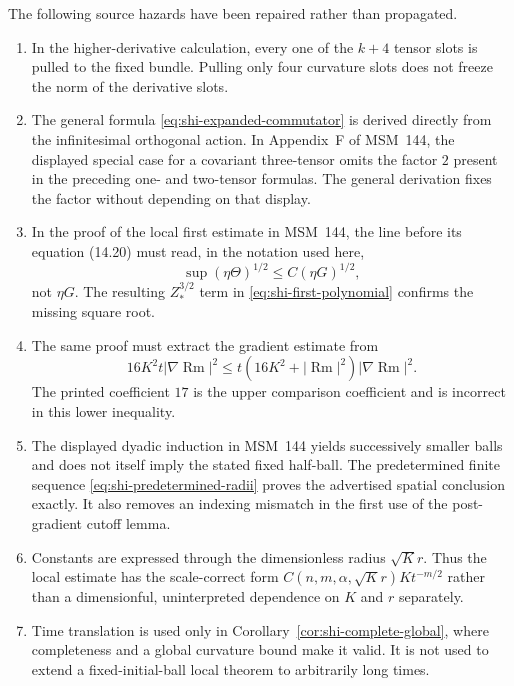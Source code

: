 \documentclass[10pt]{coll-l}
\theoremstyle{definition}
\theoremstyle{remark}
\numberwithin{section}{chapter}
\numberwithin{equation}{chapter}
\newcommand{\Rm}{\operatorname{Rm}}
\begin{document}
The following source hazards have been repaired rather than propagated.
\begin{enumerate}
\item In the higher-derivative calculation, every one of the $k+4$ tensor
      slots is pulled to the fixed bundle.  Pulling only four curvature slots
      does not freeze the norm of the derivative slots.

\item The general formula \eqref{eq:shi-expanded-commutator} is derived
      directly from the infinitesimal orthogonal action.  In Appendix~F of
      MSM~144, the displayed special case for a covariant three-tensor omits
      the factor $2$ present in the preceding one- and two-tensor formulas.
      The general derivation fixes the factor without depending on that
      display.

\item In the proof of the local first estimate in MSM~144, the line before
      its equation (14.20) must read, in the notation used here,
      \[
          \sup(\eta\Theta)^{1/2}\leq C(\eta G)^{1/2},
      \]
      not $\eta G$.  The resulting $Z_*^{3/2}$ term in
      \eqref{eq:shi-first-polynomial} confirms the missing square root.

\item The same proof must extract the gradient estimate from
      \[
        16K^2t|\nabla\Rm|^2
          \leq t(16K^2+|\Rm|^2)|\nabla\Rm|^2.
      \]
      The printed coefficient $17$ is the upper comparison coefficient and
      is incorrect in this lower inequality.

\item The displayed dyadic induction in MSM~144 yields successively smaller
      balls and does not itself imply the stated fixed half-ball.  The
      predetermined finite sequence \eqref{eq:shi-predetermined-radii}
      proves the advertised spatial conclusion exactly.  It also removes an
      indexing mismatch in the first use of the post-gradient cutoff lemma.

\item Constants are expressed through the dimensionless radius
      $\sqrt K r$.  Thus the local estimate has the scale-correct form
      $C(n,m,\alpha,\sqrt Kr)Kt^{-m/2}$ rather than a dimensionful,
      uninterpreted dependence on $K$ and $r$ separately.

\item Time translation is used only in
      Corollary~\ref{cor:shi-complete-global}, where completeness and a
      global curvature bound make it valid.  It is not used to extend a
      fixed-initial-ball local theorem to arbitrarily long times.
\end{enumerate}
\end{document}
